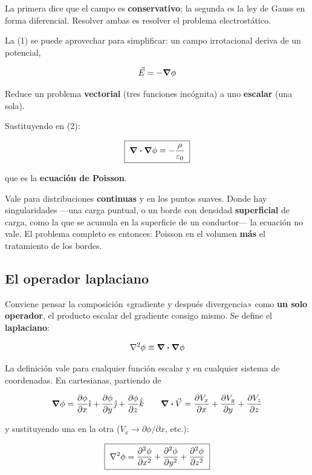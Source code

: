 \documentclass[12pt,a4paper]{article}
\begin{document}
La primera dice que el campo es \textbf{conservativo}; la segunda es la ley de
Gauss en forma diferencial. Resolver ambas es resolver el problema electrostático.

La (1) se puede aprovechar para simplificar: un campo irrotacional deriva de un
potencial,

\[
\vec E = -\grad\phi
\]

\begin{notebox}
Reduce un problema \textbf{vectorial} (tres funciones incógnita) a uno
\textbf{escalar} (una sola).
\end{notebox}

Sustituyendo en (2):

\[
\boxed{\;\div\grad\phi = -\frac{\rho}{\varepsilon_0}\;}
\]

que es la \textbf{ecuación de Poisson}.

\begin{warnbox}
Vale para distribuciones \textbf{continuas} y en los puntos suaves. Donde hay
singularidades ---una carga puntual, o un borde con densidad \textbf{superficial}
de carga, como la que se acumula en la superficie de un conductor--- la ecuación
no vale. El problema completo es entonces: Poisson en el volumen \textbf{más} el
tratamiento de los bordes.
\end{warnbox}

\subsection{El operador laplaciano}

Conviene pensar la composición «gradiente y después divergencia» como \textbf{un
solo operador}, el producto escalar del gradiente consigo mismo. Se define el
\textbf{laplaciano}:

\[
\laplacian\phi \equiv \div\grad\phi
\]

La definición vale para cualquier función escalar y en cualquier sistema de
coordenadas. En cartesianas, partiendo de

\[
\grad\phi = \pdv{\phi}{x}\hat\imath + \pdv{\phi}{y}\hat\jmath + \pdv{\phi}{z}\hat k
\qquad
\div\vec V = \pdv{V_x}{x} + \pdv{V_y}{y} + \pdv{V_z}{z}
\]

y sustituyendo una en la otra ($V_x \to \partial\phi/\partial x$, etc.):

\[
\boxed{\;\laplacian\phi = \pdv[2]{\phi}{x} + \pdv[2]{\phi}{y} + \pdv[2]{\phi}{z}\;}
\]
\end{document}
